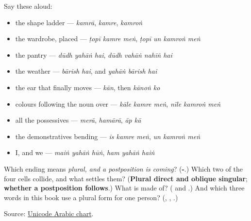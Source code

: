 Say these aloud:

\begin{itemize}
\raggedright
  \item the shape ladder — \emph{kamrā}, \emph{kamre}, \emph{kamroṅ}
  \item the wardrobe, placed — \emph{ṭopī kamre meṅ}, \emph{ṭopī un kamroṅ meṅ}
  \item the pantry — \emph{dūdh yahāṅ hai}, \emph{dūdh vahāṅ nahīṅ hai}
  \item the weather — \emph{bārish hai}, and \emph{yahāṅ bārish hai}
  \item the ear that finally moves — \emph{kān}, then \emph{kānoṅ ko}
  \item colours following the noun over — \emph{kāle kamre meṅ}, \emph{nīle kamroṅ meṅ}
  \item all the possessives — \emph{merā}, \emph{hamārā}, \emph{āp kā}
  \item the demonstratives bending — \emph{is kamre meṅ}, \emph{un kamroṅ meṅ}
  \item I, and we — \emph{maiṅ yahāṅ hūṅ}, \emph{ham yahāṅ haiṅ}
\end{itemize}

\begin{tcolorbox}[breakable,colback=teal!4,colframe=teal!35!black,title={Before you move on}]
Which ending means \emph{plural, and a postposition is coming}? (\textbf{-}.) Which two of the four cells collide, and what settles them? (\textbf{Plural direct and oblique singular}; \textbf{whether a postposition follows}.) What is \textbf{} made of? (\textbf{} and \textbf{}.) And which three words in this book use a plural form for one person? (\textbf{}, \textbf{}, \textbf{}.)

Source: \href{https://www.unicode.org/charts/PDF/U0600.pdf}{Unicode Arabic chart}.
\end{tcolorbox}
